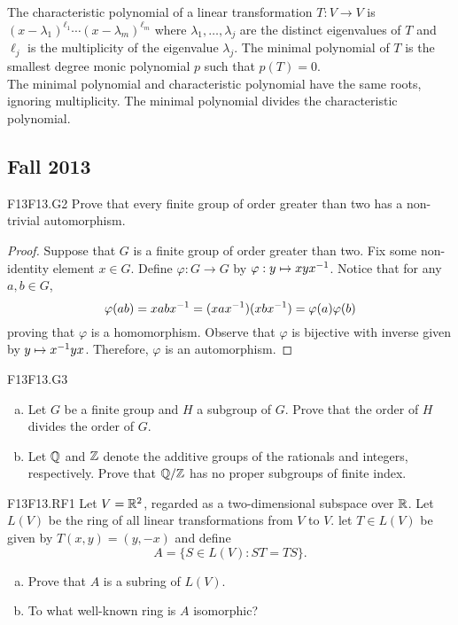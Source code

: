 \documentclass[../AlgebraQualSolutions.tex]{subfiles}
\begin{document}
The characteristic polynomial of a linear transformation $T: V \to V$ is $(x - \lambda_1)^{\ell_1}\cdots(x-\lambda_m)^{\ell_m}$ where $\lambda_1,\ldots, \lambda_j$ are the distinct eigenvalues of $T$ and $\ell_j$ is the multiplicity of the eigenvalue $\lambda_j$. The minimal polynomial of $T$ is the smallest degree monic polynomial $p$ such that $p(T) = 0$.\\

The minimal polynomial and characteristic polynomial have the same roots, ignoring multiplicity. The minimal polynomial divides the characteristic polynomial.

\subsection{Fall 2013}

\begin{prob}{F13}{F13.G2}
	Prove that every finite group of order greater than two has a non-trivial automorphism.
\end{prob}

\begin{proof}
Suppose that $G$ is a finite group of order greater than two. Fix some non-identity element $x \in G$. Define $\varphi: G \to G$ by $\varphi: y \mapsto xyx^{-1}$. Notice that for any $a,b \in G$,
	\[\varphi(ab) = xabx^{-1} = (xax^{-1})(xbx^{-1}) = \varphi(a)\varphi(b) \]
proving that $\varphi$ is a homomorphism. Observe that $\varphi$ is bijective with inverse given by $y \mapsto x^{-1} y x$. Therefore, $\varphi$ is an automorphism.
\end{proof}

\begin{prob}{F13}{F13.G3}

	\begin{enumerate}[(a)]
		\item Let $G$ be a finite group and $H$ a subgroup of $G$. Prove that the order of $H$ divides the order of $G$.
		\item  Let $\mathbb{Q}$ and $\mathbb{Z}$ denote the additive groups of the rationals and integers, respectively. Prove that $\mathbb{Q}/\mathbb{Z}$ has no proper subgroups of finite index.
	\end{enumerate}
\end{prob}

\begin{prob}{F13}{F13.RF1}
	Let $V = \mathbb{R}^2$, regarded as a two-dimensional subspace over $\mathbb{R}$. Let $L(V)$ be the ring of all linear transformations from $V$ to $V$. let $T \in L(V)$ be given by $T(x,y) = (y,-x)$ and define 
		\[A = \{S \in L(V): ST = TS\}. \]
	\begin{enumerate}[(a)]
		\item Prove that $A$ is a subring of $L(V)$.
		\item To what well-known ring is $A$ isomorphic?
	\end{enumerate}
\end{prob}
\end{document}
